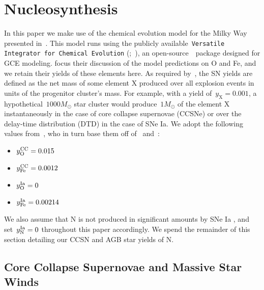 \documentclass[ms.tex]{subfiles}
\begin{document}
\section{Nucleosynthesis}
\label{sec:yields}

In this paper we make use of the chemical evolution model for the Milky Way
presented in~\citet{Johnson2021}.
This model runs using the publicly available~\texttt{Versatile Integrator for
Chemical Evolution} (\vice;~\citealp{Johnson2020, Griffith2021a, Johnson2021}),
an open-source~\python~package designed for GCE modeling.
\citet{Johnson2021} focus their discussion of the model predictions on O and
Fe, and we retain their yields of these elements here.
As required by~\vice, the SN yields are defined as the net mass of some element
X produced over all explosion events in units of the progenitor cluster's
mass.
For example, with a yield of~$y_\text{X} = 0.001$, a hypothetical~$1000 M_\odot$
star cluster would produce~$1 M_\odot$ of the element X instantaneously in the
case of core collapse supernovae (CCSNe) or over the delay-time distribution
(DTD) in the case of SNe Ia.
We adopt the following values from~\citet{Johnson2021}, who in turn base them
off of~\citet*{Weinberg2017} and~\citet{Johnson2020}:
\begin{itemize}
	\item $y_\text{O}^\text{CC} = 0.015$

	\item $y_\text{Fe}^\text{CC} = 0.0012$

	\item $y_\text{O}^\text{Ia} = 0$

	\item $y_\text{Fe}^\text{Ia} = 0.00214$
\end{itemize}
We also assume that N is not produced in significant amounts by SNe Ia
\citep{Johnson2019}, and set~$y_\text{N}^\text{Ia} = 0$ throughout this paper
accordingly.
We spend the remainder of this section detailing our CCSN and AGB star yields
of N.

\subsection{Core Collapse Supernovae and Massive Star Winds}
\label{sec:yields:ccsne}
\end{document}
